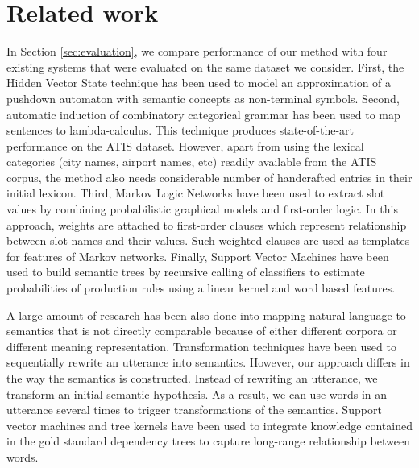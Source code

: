 \documentclass{article}
\begin{document}
\section{Related work}

In Section \ref{sec:evaluation}, we compare performance of our method with four existing systems that were evaluated on the same dataset we consider. 
First, the Hidden Vector State technique \cite{he05,jurcicek08} has been used to model an approximation of a pushdown automaton with semantic concepts as non-terminal symbols. 
Second, automatic induction of combinatory categorical grammar \cite{zettlemoyer07} has been used to map sentences to lambda-calculus. 
This technique produces state-of-the-art performance on the ATIS dataset. However, apart from using the lexical categories (city names, airport names, etc) readily available from the ATIS corpus, the method also needs considerable number of handcrafted entries in their initial lexicon. 
Third, Markov Logic Networks \cite{meza08b} have been used to extract slot values by combining probabilistic graphical models and first-order logic. In this approach, weights are attached to first-order clauses which represent relationship between slot names and their values. Such weighted clauses are used as templates for features of Markov networks.
Finally, Support Vector Machines \cite{mairesse09} have been used to build semantic trees by recursive calling of classifiers to estimate probabilities of production rules using a linear kernel and word based features.

A large amount of research has been also done into mapping natural language to semantics that is not directly comparable because of either different corpora or different meaning representation. 
Transformation techniques \cite{kate05} have been used to sequentially rewrite an utterance into semantics. However, our approach differs in the way the semantics is constructed. Instead of rewriting an utterance, we transform an initial semantic hypothesis. As a result, we can use words in an utterance several times to trigger transformations of the semantics. 
Support vector machines and tree kernels \cite{kate08} have been used to integrate knowledge contained in the gold standard dependency trees to capture long-range relationship between words. 
\end{document}
